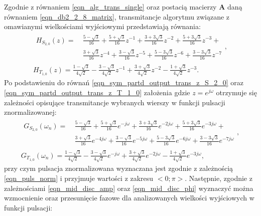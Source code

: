 Zgodnie z równaniem \eqref{eqn_alg_trans_single} oraz postacią macierzy $\mathbf{A}$ daną równaniem \eqref{eqn_db2_2_8_matrix}, transmitancje algorytmu związane z omawianymi wielkościami wyjściowymi przedstawiają równania:
\begin{gather}
\begin{split}
H_{S_{2,0}}(z) = ~
& \frac{5 - \sqrt{3}}{16} + \frac{5 + \sqrt{3}}{16} z^{-1} + \frac{3 + 3 \sqrt{3}}{16} z^{-2} + \frac{5 + 3 \sqrt{3}}{16} z^{-3} +  \\
& \frac{3 + \sqrt{3}}{16} z^{-4} + \frac{3 - \sqrt{3}}{16} z^{-5} + \frac{5 - 3 \sqrt{3}}{16} z^{-6} + \frac{3 - 3 \sqrt{3}}{16} z^{-7} 
\end{split}
\label{eqn_sym_partd_output_trans_z_S_2_0}, \\
H_{T_{1,0}}(z) = \frac{1 - \sqrt{3}}{4 \sqrt{2}} - \frac{3 - \sqrt{3}}{4 \sqrt{2}} z^{-1} + \frac{3 + \sqrt{3}}{4 \sqrt{2}} z^{-2} - \frac{1 + \sqrt{3}}{4 \sqrt{2}} z^{-3} \label{eqn_sym_partd_output_trans_z_T_1_0}.
\end{gather}
Po podstawieniu do równań \eqref{eqn_sym_partd_output_trans_z_S_2_0} oraz \eqref{eqn_sym_partd_output_trans_z_T_1_0} założenia gdzie $z = e^{j\omega}$ otrzymuje się zależności opisujące transmitancje wybranych wierszy w funkcji pulsacji znormalizowanej:
\begin{gather}
\begin{split}
G_{S_{2,0}}(\omega_{n}) = ~
& \frac{5 - \sqrt{3}}{16} + \frac{5 + \sqrt{3}}{16} e^{-j\omega} + \frac{3 + 3 \sqrt{3}}{16} e^{-2j\omega} + \frac{5 + 3 \sqrt{3}}{16} e^{-3j\omega} +  \\
& \frac{3 + \sqrt{3}}{16} e^{-4j\omega} + \frac{3 - \sqrt{3}}{16} e^{-5j\omega} + \frac{5 - 3 \sqrt{3}}{16} e^{-6j\omega} + \frac{3 - 3 \sqrt{3}}{16} e^{-7j\omega} 
\end{split}
\label{eqn_sym_partd_output_trans_wn_S_2_0}, \\
G_{T_{1,0}}(\omega_{n}) = \frac{1 - \sqrt{3}}{4 \sqrt{2}} - \frac{3 - \sqrt{3}}{4 \sqrt{2}} e^{-j\omega} + \frac{3 + \sqrt{3}}{4 \sqrt{2}} e^{-2j\omega} - \frac{1 + \sqrt{3}}{4 \sqrt{2}} e^{-3j\omega} \label{eqn_sym_partd_output_trans_wn_T_1_0},
\end{gather}
przy czym pulsacja znormalizowana wyznaczana jest zgodnie z zależnością \eqref{eqn_puls_norm} i przyjmuje wartości z zakresu $<0;\pi>$. Następnie, zgodnie z zależnościami \eqref{eqn_mid_disc_amp} oraz \eqref{eqn_mid_disc_phi} wyznaczyć można wzmocnienie oraz przesunięcie fazowe dla analizowanych wielkości wyjściowych w funkcji pulsacji:
